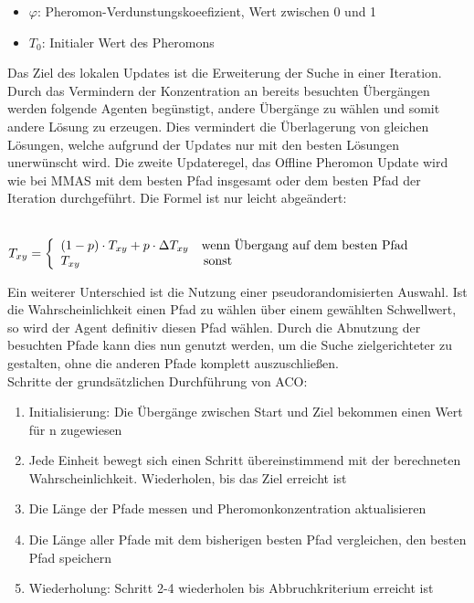 \begin{itemize}
  \item $\varphi$: Pheromon-Verdunstungskoeefizient, Wert zwischen 0 und 1
  \item $T_0$: Initialer Wert des Pheromons
\end{itemize}
Das Ziel des lokalen Updates ist die Erweiterung der Suche in einer Iteration. Durch das Vermindern der Konzentration an bereits besuchten Übergängen werden folgende Agenten begünstigt, andere Übergänge zu wählen und somit andere Lösung zu erzeugen. Dies vermindert die Überlagerung von gleichen Lösungen, welche aufgrund der Updates nur mit den besten Lösungen unerwünscht wird\cite{dorigo1997ant}. Die zweite Updateregel, das Offline Pheromon Update wird wie bei MMAS mit dem besten Pfad insgesamt oder dem besten Pfad der Iteration durchgeführt. Die Formel ist nur leicht abgeändert: \\\\

\begin{large}
  $T_{xy}  = \left\{
  \begin{array}{ll}
  (1-p)\cdot T_{xy}+p\cdot \Delta T_{xy} & \normalsize \textrm{wenn Übergang auf dem besten Pfad} \\
  T_{xy} & \, \normalsize \textrm{sonst} \\
  \end{array}
\right. $  
\end{large}


Ein weiterer Unterschied ist die Nutzung einer pseudorandomisierten Auswahl. Ist die Wahrscheinlichkeit einen Pfad zu wählen über einem gewählten Schwellwert, so wird der Agent definitiv diesen Pfad wählen. Durch die Abnutzung der besuchten Pfade kann dies nun genutzt werden, um die Suche zielgerichteter zu gestalten, ohne die anderen Pfade komplett auszuschließen\cite{gambardella1996solving}.\\

Schritte der grundsätzlichen Durchführung von ACO:
\begin{enumerate}
  \item Initialisierung: Die Übergänge zwischen Start und Ziel bekommen einen Wert für n zugewiesen
  \item Jede Einheit bewegt sich einen Schritt übereinstimmend mit der berechneten Wahrscheinlichkeit.  Wiederholen, bis das Ziel erreicht ist
  \item Die Länge der Pfade messen und Pheromonkonzentration aktualisieren
  \item Die Länge aller Pfade mit dem bisherigen besten Pfad vergleichen, den besten Pfad speichern
  \item Wiederholung: Schritt 2-4 wiederholen bis Abbruchkriterium erreicht ist
\end{enumerate}

